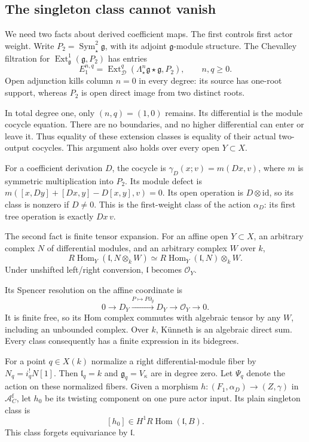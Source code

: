 \subsection{The singleton class cannot vanish}

We need two facts about derived coefficient
maps. The first controls first actor weight.
Write $P_2=\operatorname{Sym}^2_\star\mathfrak g$,
with its adjoint $\mathfrak g$-module structure.
The Chevalley filtration for
$\operatorname{Ext}^1_{\mathfrak g}(\mathfrak g,P_2)$
has entries
\[
 E_1^{n,q}=\operatorname{Ext}^q_{\mathscr D}
 (\Lambda^n_\star\mathfrak g\star\mathfrak g,P_2),
 \qquad n,q\geq0.
\]
Open adjunction kills column $n=0$ in every
degree: its source has one-root support,
whereas $P_2$ is open direct image from two
distinct roots.

In total degree one, only
$(n,q)=(1,0)$ remains. Its differential is
the module cocycle equation. There are no
boundaries, and no higher differential can
enter or leave it. Thus equality of these
extension classes is equality of their
actual two-output cocycles. This argument
also holds over every open $Y\subset X$.

For a coefficient derivation $D$, the cocycle
is $\gamma_D(x;v)=m(Dx,v)$, where $m$ is
symmetric multiplication into $P_2$.
Its module defect is
$m([x,Dy]+[Dx,y]-D[x,y],v)=0$.
Its open operation is $D\otimes\mathrm{id}$,
so its class is nonzero if $D\ne0$.
This is the first-weight class of the action
$\alpha_D$: its first tree operation is
exactly $Dx\,v$.

The second fact is finite tensor expansion.
For an affine open $Y\subset X$, an arbitrary
complex $N$ of differential modules, and an
arbitrary complex $W$ over $k$,
\begin{equation}\label{cbc:rc:coefficient-kunneth}
 R\operatorname{Hom}_Y(\mathfrak l,N\otimes_k W)
 \simeq R\operatorname{Hom}_Y(\mathfrak l,N)\otimes_k W.
\end{equation}
Under unshifted left/right conversion,
$\mathfrak l$ becomes $\mathcal O_Y$.

Its Spencer resolution on the affine coordinate is
\[
 0\longrightarrow D_Y
 \xrightarrow{P\mapsto P\partial_y}D_Y
 \longrightarrow\mathcal O_Y\longrightarrow0.
\]
It is finite free, so its Hom complex commutes
with algebraic tensor by any $W$, including
an unbounded complex. Over $k$, K\"unneth is
an algebraic direct sum. Every class consequently
has a finite expression in its bidegrees.

For a point $q\in X(k)$ normalize a right
differential-module fiber by $N_q=i_q^!N[1]$.
Then $\mathfrak l_q=k$ and $\mathfrak g_q=V_\kappa$
are in degree zero.
Let $\Psi_q$ denote the action on these normalized fibers.
Given a morphism
$h:(F_1,\alpha_D)\to(Z,\gamma)$ in
$\mathscr A_C^{\mathrm f}$, let $h_0$ be its
twisting component on one pure actor input.
Its plain singleton class is
\[
 [h_0]\in H^1R\operatorname{Hom}(\mathfrak l,B).
\]
This class forgets equivariance by $\mathfrak l$.

